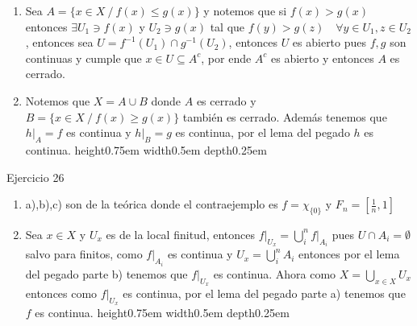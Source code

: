 \documentclass[11pt]{article}
\newcommand{\sett}[1]{\{#1\}}
\newenvironment{proof}[1][Demostraci\'on]{\begin{trivlist}
\item[\hskip \labelsep {\bfseries #1}]}{\end{trivlist}}
\newcommand{\qed}{\nobreak \ifvmode \relax \else
      \ifdim\lastskip<1.5em \hskip-\lastskip
      \hskip1.5em plus0em minus0.5em \fi \nobreak
      \vrule height0.75em width0.5em depth0.25em\fi}
\begin{document}
\begin{enumerate}
\begin{proof}
\begin{enumerate}
\item Sea $A = \sett{x \in X \ / \ f(x) \leq g(x)}$ y notemos que si $f(x) > g(x)$ entonces $\exists U_1 \ni f(x)$ y $U_2 \ni g(x)$ tal que $f(y) > g(z) \quad \forall y \in U_1,z \in U_2$, entonces sea $U = f^{-1}(U_1) \cap g^{-1}(U_2)$, entonces $U$ es abierto pues $f,g$ son continuas y cumple que $x \in U \subseteq A^{c}$, por ende $A^{c}$ es abierto y entonces $A$ es cerrado.
\item Notemos que $X = A \cup B$ donde $A$ es cerrado y $B = \sett{x \in X \ / \ f(x) \geq g(x)}$ tambi\'en es cerrado. Adem\'as tenemos que $h|_A = f$ es continua y $h|_{B} = g$ es continua, por el lema del pegado $h$ es continua. \qed
\end{enumerate}
\end{proof}

\item {Ejercicio 26}

\begin{proof}

\begin{enumerate}
\item a),b),c) son de la te\'orica donde el contraejemplo es $f= \chi_{\sett{0}}$ y $F_n=[\frac{1}{n},1]$
\item Sea $x \in X$ y $U_x$ es de la local finitud, entonces $f|_{U_x} = \bigcup_{i}^{n}{f|_{A_i}}$ pues $U \cap A_i = \emptyset$ salvo para finitos, como $f|_{A_i}$ es continua y $U_x = \bigcup_{i}^{n}{A_i}$ entonces por el lema del pegado parte b) tenemos que $f|_{U_x}$ es continua. Ahora como $X = \bigcup_{x \in X}{U_x}$ entonces como $f|_{U_x}$ es continua, por el lema del pegado parte a) tenemos que $f$ es continua. \qed
\end{enumerate}

\end{proof}

\end{enumerate}
\end{document}
